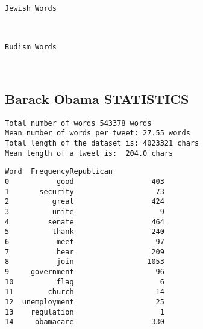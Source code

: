 \documentclass[11pt]{article}
\begin{document}
    \begin{Verbatim}[commandchars=\\\{\}]
Jewish Words
    \end{Verbatim}

    \begin{center}
    \end{center}
    { \hspace*{\fill} \\}
    
    \begin{Verbatim}[commandchars=\\\{\}]
Budism Words
    \end{Verbatim}

    \begin{center}
    \end{center}
    { \hspace*{\fill} \\}
    
    \hypertarget{barack-obama-statistics}{%
\subsection{Barack Obama STATISTICS}\label{barack-obama-statistics}}

    

    \begin{Verbatim}[commandchars=\\\{\}]
Total number of words 543378 words
Mean number of words per tweet: 27.55 words
Total length of the dataset is: 4023321 chars
Mean length of a tweet is:  204.0 chars
    \end{Verbatim}

            \begin{tcolorbox}[breakable, size=fbox, boxrule=.5pt, pad at break*=1mm, opacityfill=0]
\begin{Verbatim}[commandchars=\\\{\}]
            Word  FrequencyRepublican
0           good                  403
1       security                   73
2          great                  424
3          unite                    9
4         senate                  464
5          thank                  240
6           meet                   97
7           hear                  209
8           join                 1053
9     government                   96
10          flag                    6
11        church                   14
12  unemployment                   25
13    regulation                    1
14     obamacare                  330
\end{Verbatim}
\end{tcolorbox}
        
\end{document}
